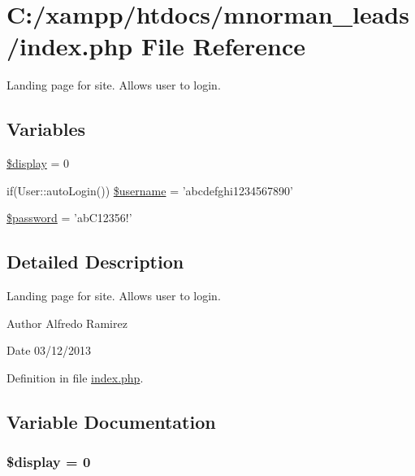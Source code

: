 \hypertarget{index_8php}{\section{C\-:/xampp/htdocs/mnorman\-\_\-leads/index.php File Reference}
\label{index_8php}
}


Landing page for site. Allows user to login.  


\subsection*{Variables}
\begin{DoxyCompactItemize}
\item 
\hyperlink{index_8php_ad6dc42004a9f1865676e24cab0b0445b}{\$display} = 0
\item 
if(User\-::auto\-Login()) \hyperlink{index_8php_a658cbc82540a98b3564f370b127616c3}{\$username} = 'abcdefghi1234567890'
\item 
\hyperlink{index_8php_a607686ef9f99ea7c42f4f3dd3dbb2b0d}{\$password} = 'ab\-C12356!'
\end{DoxyCompactItemize}


\subsection{Detailed Description}
Landing page for site. Allows user to login. \begin{DoxyAuthor}{Author}
Alfredo Ramirez 
\end{DoxyAuthor}
\begin{DoxyDate}{Date}
03/12/2013 
\end{DoxyDate}


Definition in file \hyperlink{index_8php_source}{index.\-php}.



\subsection{Variable Documentation}
\hypertarget{index_8php_ad6dc42004a9f1865676e24cab0b0445b}{
\subsubsection[{\$display}]{\setlength{\rightskip}{0pt plus 5cm}\$display = 0}}\label{index_8php_ad6dc42004a9f1865676e24cab0b0445b}



